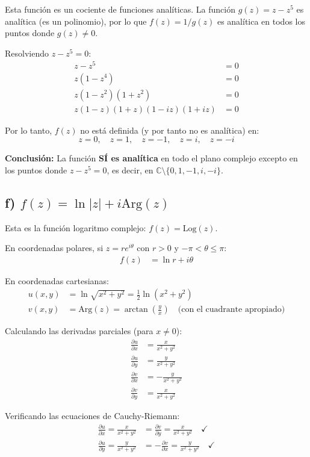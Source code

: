 \documentclass{article}
\begin{document}
Esta función es un cociente de funciones analíticas. La función $g(z) = z - z^5$ es analítica (es un polinomio), por lo que $f(z) = 1/g(z)$ es analítica en todos los puntos donde $g(z) \neq 0$.

Resolviendo $z - z^5 = 0$:
\begin{align*}
z - z^5 &= 0 \\
z(1 - z^4) &= 0 \\
z(1 - z^2)(1 + z^2) &= 0 \\
z(1 - z)(1 + z)(1 - iz)(1 + iz) &= 0
\end{align*}

Por lo tanto, $f(z)$ no está definida (y por tanto no es analítica) en:
$$z = 0, \quad z = 1, \quad z = -1, \quad z = i, \quad z = -i$$

\textbf{Conclusión:} La función \textbf{SÍ es analítica} en todo el plano complejo excepto en los puntos donde $z - z^5 = 0$, es decir, en $\mathbb{C} \setminus \{0, 1, -1, i, -i\}$.

\subsection*{f) $f(z) = \ln|z| + i\text{Arg}(z)$}

Esta es la función logaritmo complejo: $f(z) = \text{Log}(z)$.

En coordenadas polares, si $z = re^{i\theta}$ con $r > 0$ y $-\pi < \theta \leq \pi$:
\begin{align*}
f(z) &= \ln r + i\theta
\end{align*}

En coordenadas cartesianas:
\begin{align*}
u(x,y) &= \ln\sqrt{x^2 + y^2} = \frac{1}{2}\ln(x^2 + y^2) \\
v(x,y) &= \text{Arg}(z) = \arctan\left(\frac{y}{x}\right) \quad \text{(con el cuadrante apropiado)}
\end{align*}

Calculando las derivadas parciales (para $x \neq 0$):
\begin{align*}
\frac{\partial u}{\partial x} &= \frac{x}{x^2 + y^2} \\
\frac{\partial u}{\partial y} &= \frac{y}{x^2 + y^2} \\
\frac{\partial v}{\partial x} &= -\frac{y}{x^2 + y^2} \\
\frac{\partial v}{\partial y} &= \frac{x}{x^2 + y^2}
\end{align*}

Verificando las ecuaciones de Cauchy-Riemann:
\begin{align*}
\frac{\partial u}{\partial x} = \frac{x}{x^2 + y^2} &= \frac{\partial v}{\partial y} = \frac{x}{x^2 + y^2} \quad \checkmark \\
\frac{\partial u}{\partial y} = \frac{y}{x^2 + y^2} &= -\frac{\partial v}{\partial x} = \frac{y}{x^2 + y^2} \quad \checkmark
\end{align*}
\end{document}
